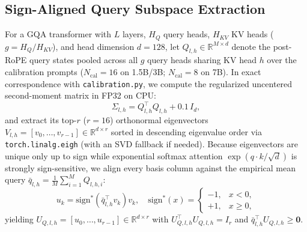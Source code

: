 \documentclass[conference]{IEEEtran}
\begin{document}
\subsection{Sign-Aligned Query Subspace Extraction}
For a GQA transformer with $L$ layers, $H_Q$ query heads, $H_{KV}$ KV heads ($g = H_Q / H_{KV}$), and head dimension $d = 128$, let $Q_{l,h} \in \mathbb{R}^{M \times d}$ denote the post-RoPE query states pooled across all $g$ query heads sharing KV head $h$ over the calibration prompts ($N_{\text{cal}} = 16$ on 1.5B/3B; $N_{\text{cal}} = 8$ on 7B). In exact correspondence with \texttt{calibration.py}, we compute the regularized uncentered second-moment matrix in FP32 on CPU:
\begin{equation}
\Sigma_{l,h} = Q_{l,h}^\top Q_{l,h} + 0.1 \, I_d,
\label{eq:uncentered_cov}
\end{equation}
and extract its top-$r$ ($r = 16$) orthonormal eigenvectors $V_{l,h} = [v_0, \dots, v_{r-1}] \in \mathbb{R}^{d \times r}$ sorted in descending eigenvalue order via \texttt{torch.linalg.eigh} (with an SVD fallback if needed). Because eigenvectors are unique only up to sign while exponential softmax attention $\exp(q \cdot k / \sqrt{d})$ is strongly sign-sensitive, we align every basis column against the empirical mean query $\bar{q}_{l,h} = \frac{1}{M}\sum_{i=1}^M Q_{l,h,i}$:
\begin{equation}
u_k = \text{sign}^{*}\!\left(\bar{q}_{l,h}^\top v_k\right) v_k, \quad \text{sign}^{*}(x) = \begin{cases} -1, & x < 0, \\ +1, & x \ge 0, \end{cases}
\label{eq:sign_align}
\end{equation}
yielding $U_{Q,l,h} = [u_0, \dots, u_{r-1}] \in \mathbb{R}^{d \times r}$ with $U_{Q,l,h}^\top U_{Q,l,h} = I_r$ and $\bar{q}_{l,h}^\top U_{Q,l,h} \ge \mathbf{0}$.
\end{document}
